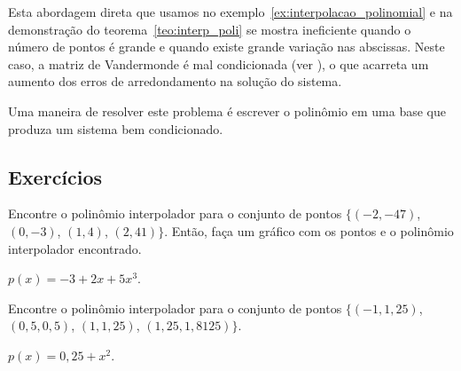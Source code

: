 
Esta abordagem direta que usamos no exemplo~\ref{ex:interpolacao_polinomial} e na demonstração do teorema~\ref{teo:interp_poli} se mostra ineficiente quando o número de pontos é grande e quando existe grande variação nas abscissas. Neste caso, a matriz de Vandermonde é mal condicionada (ver \cite{Gautschi}), o que acarreta um aumento dos erros de arredondamento na solução do sistema.

Uma maneira de resolver este problema é escrever o polinômio em uma base que produza um sistema bem condicionado.

\subsection*{Exercícios}

\begin{exer}\label{exer:interp1}
Encontre o polinômio interpolador para o conjunto de pontos $\{(-2, -47)$, $(0, -3)$, $(1, 4)$, $(2, 41)\}$. Então, faça um gráfico com os pontos e o polinômio interpolador encontrado.
\end{exer}
\begin{resp}
  
    $p(x) = -3 + 2x + 5x^3$.
  
\end{resp}

\begin{exer}
  Encontre o polinômio interpolador para o conjunto de pontos $\{(-1, 1,25)$, $(0,5, 0,5)$, $(1, 1,25)$, $(1,25, 1,8125)\}$.
\end{exer}
\begin{resp}
  
    $p(x) = 0,25 + x^2$.
  
\end{resp}

